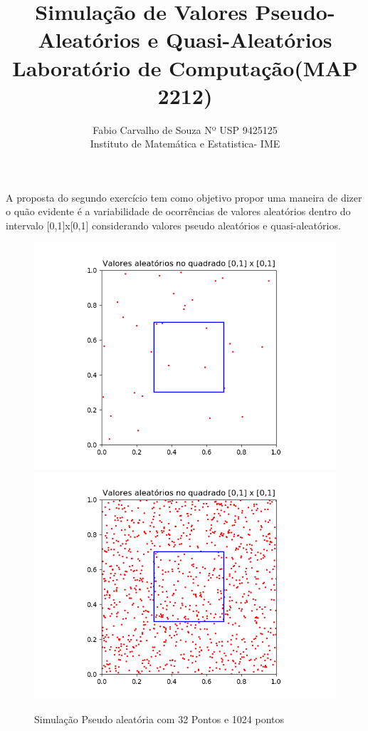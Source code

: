 \documentclass[a4paper, 12pt]{article}
\title{Simulação de Valores Pseudo-Aleatórios e Quasi-Aleatórios \\
\large Laboratório de Computação(MAP 2212)}
\author{Fabio Carvalho de Souza Nº USP 9425125 \\ 
Instituto de Matemática e Estatistica- IME}
\begin{document}
\maketitle

   A proposta do segundo exercício tem como objetivo propor uma maneira de dizer o quão evidente é a variabilidade de ocorrências de valores aleatórios dentro do intervalo [0,1]x[0,1] considerando valores pseudo aleatórios e quasi-aleatórios.
  \begin{figure}[h]
  \centering
  \includegraphics[scale=0.35]{32pseudo.png}
  \includegraphics[scale=0.35]{pseudo10.png}
  \caption{Simulação Pseudo aleatória com 32 Pontos e 1024 pontos}
  \label{figura:32pseudo}
  \end{figure}
  
\end{document}
